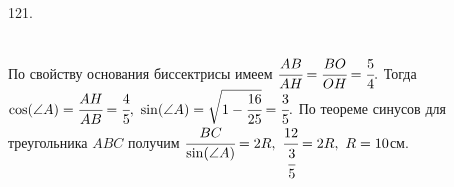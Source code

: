 121. \begin{figure}[ht!]
\end{figure}\\
По свойству основания биссектрисы имеем $\cfrac{AB}{AH}=\cfrac{BO}{OH}=\cfrac{5}{4}.$ Тогда $\cos(\angle A)=\cfrac{AH}{AB}=\cfrac{4}{5},\ \sin(\angle A)=\sqrt{1-\cfrac{16}{25}}=\cfrac{3}{5}.$ По теореме синусов для треугольника $ABC$ получим $\cfrac{BC}{\sin(\angle A)}=2R,\ \cfrac{12}{\cfrac{3}{5}}=2R,\ R=10$см.\\
